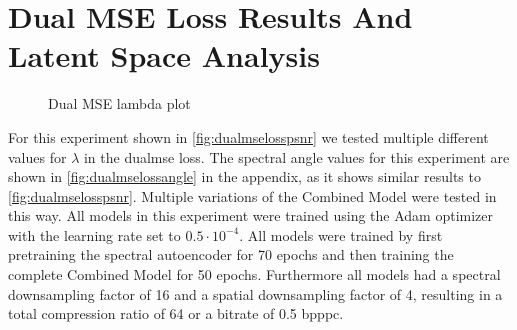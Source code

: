 \section{Dual MSE Loss Results And Latent Space Analysis \label{sec:ch5dualmse}}
\begin{figure}
	\centering
	\datatable
	\caption{Dual MSE lambda plot}
	\label{fig:dualmselosspsnr}
	\end{figure}
For this experiment shown in \autoref{fig:dualmselosspsnr} we tested multiple different values for $\lambda$ in the \ac{dualmse} loss. The spectral angle values for this experiment are shown in \autoref{fig:dualmselossangle} in the appendix, as it shows similar results to \autoref{fig:dualmselosspsnr}. Multiple variations of the Combined Model were tested in this way. All models in this experiment were trained using the Adam optimizer with the learning rate set to $0.5\cdot 10^{-4}$. All models were trained by first pretraining the spectral autoencoder for 70 epochs and then training the complete Combined Model for 50 epochs. Furthermore all models had a spectral downsampling factor of 16 and a spatial downsampling factor of 4, resulting in a total compression ratio of 64 or a bitrate of 0.5 \ac{bpppc}.

